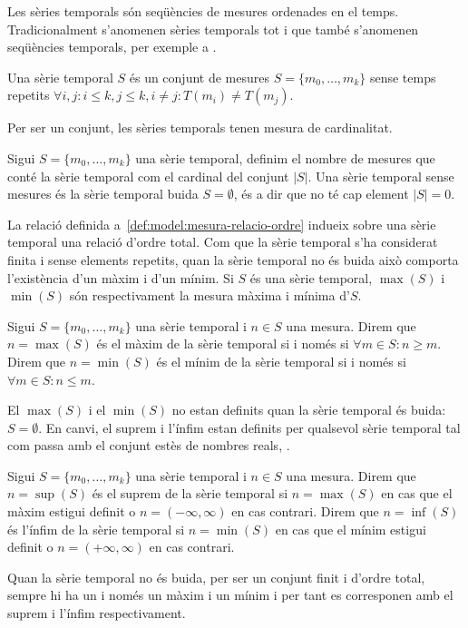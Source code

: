 Les sèries temporals són seqüències de mesures ordenades en el temps. 
Tradicionalment s'anomenen sèries temporals tot i que també s'anomenen seqüències temporals, per exemple a \cite{last:hetland}.

\begin{definition}
  \label{def:serie_temporal}
  Una sèrie temporal $S$ és un conjunt de mesures
  $S=\{m_0,\ldots,m_k\}$ sense temps repetits
  $\forall i,j: i\leq k, j\leq k, i\neq j : T(m_i)\neq T(m_j)$.
\end{definition}

Per ser un conjunt, les sèries temporals tenen mesura de cardinalitat.
\begin{definition}[Cardinal]
Sigui $S=\{m_0,\ldots,m_k\}$ una sèrie temporal, definim el nombre de
mesures que conté la sèrie temporal com el cardinal del conjunt
$|S|$. Una sèrie temporal sense mesures és la sèrie temporal buida $S=
\emptyset$, és a dir que no té cap element $|S|=0$.
\end{definition}

La relació definida a~\ref{def:model:mesura-relacio-ordre} indueix
sobre una sèrie temporal una relació d'ordre total. Com que la sèrie
temporal s'ha considerat finita i sense elements repetits, quan la
sèrie temporal no és buida això comporta l'existència d'un màxim i
d'un mínim.  Si $S$ és una sèrie temporal, $\max(S)$ i $\min(S)$ són
respectivament la mesura màxima i mínima d'$S$.

\begin{definition}
  Sigui $S=\{m_0,\ldots,m_k\}$ una sèrie temporal i $n\in S$ una
  mesura.  Direm que $n=\max(S)$ és el màxim de la sèrie temporal si i
  només si $\forall m \in S: n \geq m $.  Direm que $n=\min(S)$ és el
  mínim de la sèrie temporal si i només si $\forall m \in S: n \leq
  m$.
\end{definition}

El $\max(S)$ i el $\min(S)$ no estan definits quan la sèrie temporal
és buida: $S= \emptyset$. En
canvi, el suprem i l'ínfim estan definits per qualsevol
sèrie temporal tal com passa amb el conjunt estès de nombres reals,
\cite{cantrell:extendedreal}.  

\begin{definition}
  Sigui $S=\{m_0,\ldots,m_k\}$ una sèrie temporal i $n\in S$ una
  mesura.  Direm que $n=\sup(S)$ és el suprem de la sèrie temporal si
  $n=\max(S)$ en cas que el màxim estigui definit o
  $n=(-\infty,\infty)$ en cas contrari.  Direm que $n=\inf(S)$ és
  l'ínfim de la sèrie temporal si $n=\min(S)$ en cas que el mínim
  estigui definit o $n=(+\infty,\infty)$ en cas contrari.
\end{definition}
Quan la sèrie temporal no és buida, per
ser un conjunt finit i d'ordre total, sempre hi ha un i només un màxim
i un mínim i per tant es corresponen amb el suprem i l'ínfim
respectivament.


